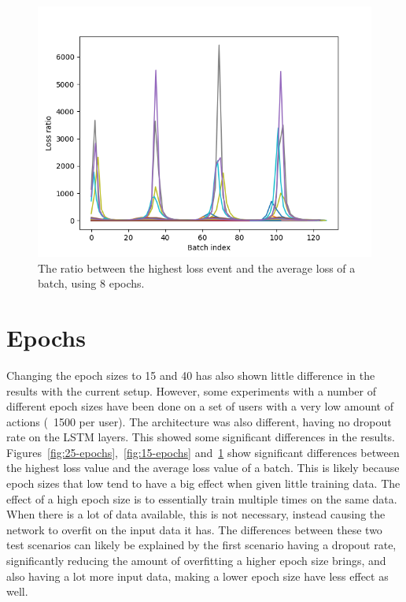 \begin{figure}
	\begin{center}
		\includegraphics[scale=0.7]{experiments/epochs/8-epochs}
	\end{center}
	\caption{The ratio between the highest loss event and the average loss of a batch, using 8 epochs.~\label{fig:8-epochs}}
\end{figure}

\section{Epochs}
Changing the epoch sizes to 15 and 40 has also shown little difference in the results with the current setup. However, some experiments with a number of different epoch sizes have been done on a set of users with a very low amount of actions (~1500 per user). The architecture was also different, having no dropout rate on the LSTM layers. This showed some significant differences in the results. Figures~\ref{fig:25-epochs},~\ref{fig:15-epochs} and~\ref{fig:8-epochs} show significant differences between the highest loss value and the average loss value of a batch. This is likely because epoch sizes that low tend to have a big effect when given little training data. The effect of a high epoch size is to essentially train multiple times on the same data. When there is a lot of data available, this is not necessary, instead causing the network to overfit on the input data it has. The differences between these two test scenarios can likely be explained by the first scenario having a dropout rate, significantly reducing the amount of overfitting a higher epoch size brings, and also having a lot more input data, making a lower epoch size have less effect as well.

